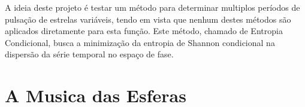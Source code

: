 
A ideia deste projeto é testar um método para determinar multiplos períodos de pulsa\c{c}ão de estrelas variáveis, tendo em vista que nenhum destes métodos são aplicados diretamente para esta fun\c{c}ão. Este método, chamado de Entropia Condicional, busca a minimiza\c{c}ão da entropia de Shannon condicional na dispersão da série temporal no espa\c{c}o de fase.


\section{A Musica das Esferas}
